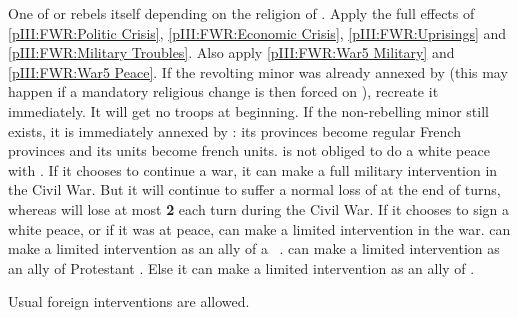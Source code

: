 \phevnt
\aparag One of \lig or \hug rebels itself depending on the religion of
\FRA. Apply the full effects of \ref{pIII:FWR:Politic Crisis},
\ref{pIII:FWR:Economic Crisis}, \ref{pIII:FWR:Uprisings} and
\ref{pIII:FWR:Military Troubles}.  Also apply \ref{pIII:FWR:War5 Military} and
\ref{pIII:FWR:War5 Peace}.
\aparag If the revolting minor was already annexed by \FRA (this may happen if
a mandatory religious change is then forced on \FRA), recreate it
immediately. It will get no troops at beginning.
\aparag If the non-rebelling minor still exists, it is immediately annexed by
\FRA: its provinces become regular French provinces and its units become
french units.
\aparag \REB is not obliged to do a white peace with \FRA.
\bparag If it chooses to continue a war, it can make a full military
intervention in the Civil War. But it will continue to suffer a normal loss of
\STAB at the end of turns, whereas \FRA will lose at most {\bf 2} \STAB each
turn during the Civil War.
\bparag If it chooses to sign a white peace, or if it was at peace, \REB can
make a limited intervention in the war.
\aparag \LIG can make a limited intervention as an ally of a \CATHCR\ \FRA.
\aparag \HOL can make a limited intervention as an ally of Protestant
\FRA. Else it can make a limited intervention as an ally of \hug.

\phdipl
\aparag Usual foreign interventions are allowed.

